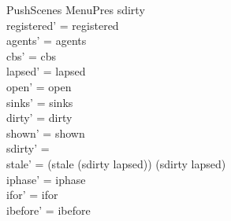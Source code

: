 \documentclass[a4paper,10pt,fleqn]{article}
\begin{document}
\begin{schema}{PushScenes}
  \Delta MenuPres
\where
  sdirty \neq \emptyset \\
  registered' = registered \\
  agents' = agents \\
  cbs' = cbs \\
  lapsed' = lapsed \\
  open' = open \\
  sinks' = sinks \\
  dirty' = dirty \\
  shown' = shown \\
  sdirty' = \emptyset \\
  stale' = (stale \setminus (sdirty \setminus lapsed)) \cup (sdirty \cap lapsed) \\
  iphase' = iphase \\
  ifor' = ifor \\
  ibefore' = ibefore
\end{schema}
\end{document}
